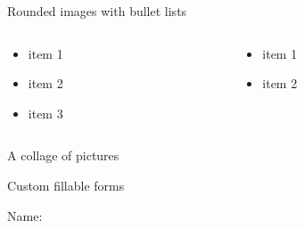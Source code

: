 \documentclass{beamer}
\begin{document}
    \begin{frame}{Rounded images with bullet lists}
    \begin{columns}
        \begin{column}{0.49\textwidth}
            \begin{itemize}
                \item item 1
                \item item 2
                \item item 3
            \end{itemize}
            \begin{figure}
                \centering
            \end{figure}
        \end{column}
        \begin{column}{0.49\textwidth}
            \begin{figure}
                \centering
            \end{figure}
            \vspace{0.5cm}
            \begin{itemize}
                \item item 1
                \item item 2
            \end{itemize}
            \vspace{1cm}
        \end{column}
    \end{columns}
    \end{frame}

    
    \begin{frame}{A collage of pictures}

    \begin{figure}
    \end{figure}
    \end{frame}

    
    \begin{frame}{Custom fillable forms}
    
        \begin{Form}
           Name: \TextField[width=0.5\textwidth]{}{}
        \end{Form}
    
    \end{frame}
    
\end{document}
